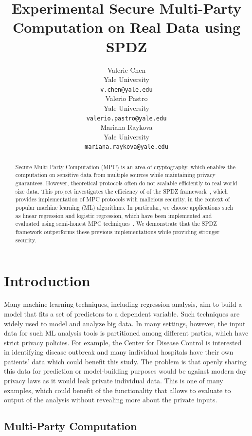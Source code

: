 \documentclass{article}
\title{Experimental Secure Multi-Party Computation on Real Data using SPDZ}
\author{
  Valerie Chen\\
  Yale University\\
  \texttt{v.chen@yale.edu} \\
  \And
  Valerio Pastro\\
  Yale University\\
  \texttt{valerio.pastro@yale.edu}\\
  \And
  Mariana Raykova \\
  Yale University \\
  \texttt{mariana.raykova@yale.edu} \\
}
\begin{document}
\maketitle

\begin{abstract}
Secure Multi-Party Computation (MPC) is an area of cryptography, which enables the computation on sensitive data from multiple sources while maintaining privacy guarantees.
However, theoretical protocols often do not scalable efficiently to real world size data. This project investigates the efficiency of of the SPDZ framework~\cite{SPDZ12}, which provides implementation
of MPC protocols with malicious security, in the context of popular machine learning (ML) algorithms. In particular, we choose applications such as linear regression and logistic regression,
which have been implemented and evaluated using semi-honest MPC techniques~\cite{GSB0DZE17, MZ17}. We demonstrate that the SPDZ framework outperforms these previous implementations while providing stronger security.
\end{abstract}


\section{Introduction}

Many machine learning techniques, including regression analysis, aim to build a model that fits a set of predictors to a dependent variable. Such techniques are widely used to model and analyze big data.
In many settings, however, the input data for such ML analysis tools is partitioned among different parties, which have strict privacy policies. For example, the Center for Disease Control is interested in identifying disease outbreak and many individual hospitals have their own patients' data which could benefit this study. The problem is that openly sharing this data for prediction or model-building purposes would be against modern day privacy laws as it would leak private individual data. This is one of many examples, which could benefit of the functionality that allows to evaluate to output of the analysis without revealing more about the private inputs.

\subsection{Multi-Party Computation}
\end{document}
